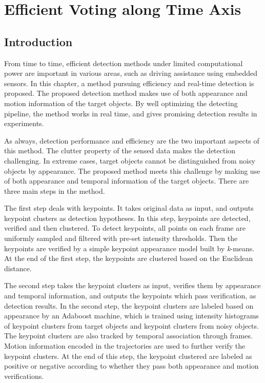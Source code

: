 \chapter{Efficient Voting along Time Axis}
\label{chp3}

\section{Introduction}

From time to time, efficient detection methods under limited computational power are important in various areas, such as driving assistance using embedded sensors. In this chapter, a method pursuing efficiency and real-time detection is proposed.
The proposed detection method makes use of both
appearance and motion information of the target objects. By well optimizing the detecting pipeline, the
method works in real time, and gives promising detection results in experiments.

As always, detection performance and efficiency are the two important aspects of this method.
The clutter property of the sensed data makes the detection challenging. In extreme cases, target objects cannot be distinguished from noisy objects by appearance.
The proposed method meets this challenge by making use of both appearance and temporal information of the target objects.
There are three main steps in the method.

The first step deals with keypoints. It takes original data as input, and outputs keypoint clusters as detection hypotheses. In this step, keypoints are detected, verified and then clustered. To detect keypoints, all points on each frame are uniformly sampled and filtered with pre-set intensity thresholds.  Then the keypoints are verified by a simple keypoint appearance model   built by \emph{k}-means. At the end of the first step, the keypoints are clustered based on the Euclidean distance.

The second step takes the keypoint clusters as input, verifies them by appearance and temporal information, and outputs the keypoints which pass verification, as detection results. In the second step, the keypoint clusters are labeled based on appearance by an Adaboost machine, which is trained using intensity histograms of keypoint clusters from target objects and keypoint clusters from noisy objects. The keypoint clusters are also tracked by temporal association through frames. Motion information encoded in the trajectories are used to further verify the keypoint clusters. At the end of this step, the keypoint clustered are labeled as positive or negative according to whether they pass both appearance and motion verifications.

